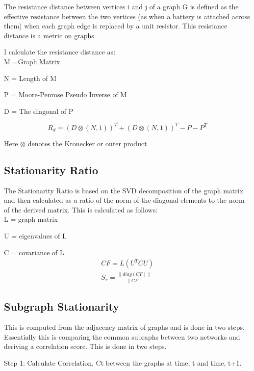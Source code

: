 The resistance distance between vertices i and j of a graph G is defined as the effective resistance between the two vertices (as when a battery is attached across them) when each graph edge is replaced by a unit resistor. This resistance distance is a metric on graphs.

I calculate the resistance distance as:\\

M =Graph Matrix

N = Length of M

P = Moore-Penrose Pseudo Inverse of M

D = The diagonal of P

\begin{equation}
      R_d = (D \otimes (N,1))^T + (D \otimes (N,1))^T - P - P^T 
\end{equation}

Here $\otimes$ denotes the Kronecker or outer product

\subsection{Stationarity Ratio}

The Stationarity Ratio is based on the SVD decomposition of the graph matrix and then calculated as a ratio of the norm of the diagonal elements to the norm of the  derived matrix. This is calculated as follows:\\

 L = graph matrix 

 U = eigenvalues of L

 C = covariance of L
\begin{equation}
   \begin{align*}
       CF = L (U^T C U)\\
        S_r = \frac{\|diag(CF) \|}{\|CF \|} 
   \end{align*}
\end{equation}

  
\subsection{Subgraph Stationarity}

This is computed from the adjacency matrix of graphs and is done in two steps. Essentially this is comparing the common subraphs between two networks and deriving a correlation score. This is done in two steps.

Step 1: Calculate Correlation, Ct between the graphs at time, t and time, t+1.

